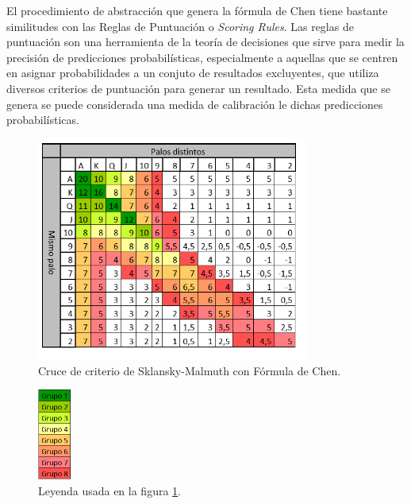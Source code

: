 El procedimiento de abstracción que genera la fórmula de Chen tiene bastante similitudes con las Reglas de Puntuación o \textit{Scoring Rules}. Las reglas de puntuación son una herramienta de la teoría de decisiones que sirve para medir la precisión de predicciones probabilísticas, especialmente a aquellas que se centren en asignar probabilidades a un conjuto de resultados excluyentes, que utiliza diversos criterios de puntuación para generar un resultado. Esta medida que se genera se puede considerada una medida de calibración le dichas predicciones probabilísticas.

\begin{figure}[h]
\centering
\includegraphics[width=0.8\textwidth]{figuras/chen-sklansky.png}   
\caption{Cruce de criterio de Sklansky-Malmuth con Fórmula de Chen.\cite{propiaChen}}
\label{fig:sklansky}
\end{figure}

\begin{figure}[h]
\centering
\includegraphics[width=0.1\textwidth]{figuras/grupos.png}   
\caption{Leyenda usada en la figura \ref{fig:sklansky}. \cite{propiaChen}}
\label{fig:Leyenda}
\end{figure}
